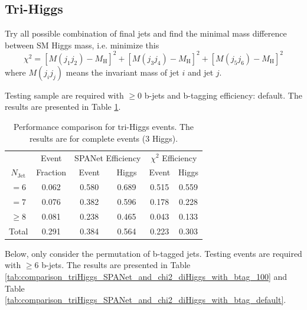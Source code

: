 \documentclass[12pt]{article}
\begin{document}
	\subsection{Tri-Higgs}%
	\label{sub:tri_higgs}
		Try all possible combination of final jets and find the minimal mass difference between SM Higgs mass, i.e. minimize this
		\begin{equation}\label{eq:triHiggs_chisq}
			\chi^2 = [M(j_1j_2)-M_\text{H}]^2 + [M(j_3j_4)-M_\text{H}]^2  + [M(j_5j_6)-M_\text{H}]^2
		\end{equation}
		where $M(j_ij_j)$ means the invariant mass of jet $i$ and jet $j$.

		Testing sample are required with $\ge 0$ b-jets and b-tagging efficiency: default. The results are presented in Table \ref{tab:comparison_triHiggs_SPANet_and_chi2}.

		\begin{table}[htpb]
			\centering
			\caption{Performance comparison for tri-Higgs events. The results are for complete events (3 Higgs).}
			\label{tab:comparison_triHiggs_SPANet_and_chi2}
			\begin{tabular}{c|c|cc|cc}
					  & Event    & \multicolumn{2}{|c|}{SPANet Efficiency} & \multicolumn{2}{|c}{ $\chi^2$ Efficiency} \\
				$N_\text{Jet}$ & Fraction & Event             & Higgs             & Event            & Higgs           \\
				\hline
				$=6$	  &   0.062       &     0.580       &   0.689       &   0.515           &    0.559             \\
				$=7$	  &   0.076       &     0.382       &   0.596       &   0.178           &    0.228            \\
				$\ge 8$	  &   0.081       &     0.238       &   0.465		&   0.043           &    0.133            \\
				Total	  &   0.291       &     0.384       &   0.564       &   0.223           &    0.303            
			\end{tabular}
		\end{table}

		Below, only consider the permutation of b-tagged jets. Testing events are required with $\ge 6$ b-jets. The results are presented in Table \ref{tab:comparison_triHiggs_SPANet_and_chi2_diHiggs_with_btag_100} and Table \ref{tab:comparison_triHiggs_SPANet_and_chi2_diHiggs_with_btag_default}.
\end{document}
